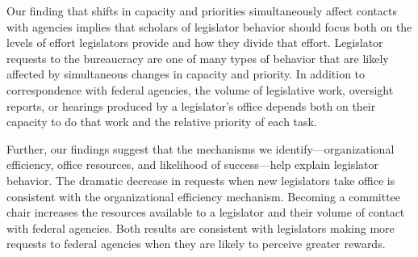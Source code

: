 \documentclass[12pt]{article}
\begin{document}
Our finding that shifts in capacity and priorities simultaneously affect contacts with agencies implies that scholars of legislator behavior should focus both on the levels of effort legislators provide and how they divide that effort. Legislator requests to the bureaucracy are one of many types of behavior that are likely affected by simultaneous changes in capacity and priority. In addition to correspondence with federal agencies, the volume of legislative work, oversight reports, or hearings produced by a legislator's office depends both on their capacity to do that work and the relative priority of each task. %

Further, our findings suggest that the mechanisms we identify---organizational efficiency, office resources, and likelihood of success---help explain legislator behavior. The dramatic decrease in requests when new legislators take office is consistent with the organizational efficiency mechanism. Becoming a committee chair increases the resources available to a legislator and their volume of contact with federal agencies. Both results are consistent with legislators making more requests to federal agencies when they are likely to perceive greater rewards.

\end{document}
